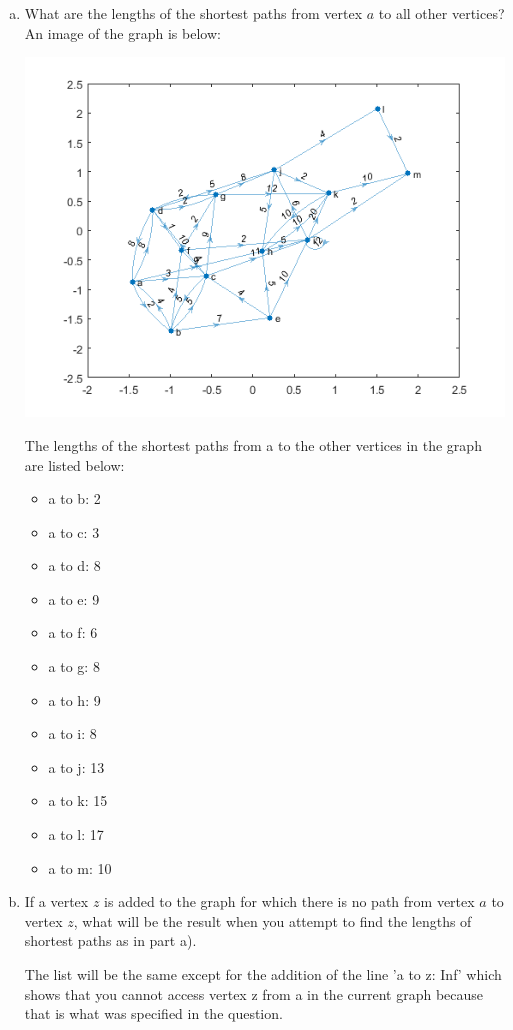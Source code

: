\documentclass[../report/main.tex]{subfiles}
\begin{document}
\begin{enumerate}[a)]
	\item What are the lengths of the shortest paths from vertex $a$ to all other vertices?
    An image of the graph is below:

    \includegraphics{../problem_three/problem3_digraph.png}

    The lengths of the shortest paths from a to the other vertices in the graph are listed below:
    \begin{itemize}
        \item a to b: 2
        \item a to c: 3
        \item a to d: 8
        \item a to e: 9
        \item a to f: 6
        \item a to g: 8
        \item a to h: 9
        \item a to i: 8
        \item a to j: 13
        \item a to k: 15
        \item a to l: 17
        \item a to m: 10
    \end{itemize}
	\item If a vertex $z$ is added to the graph for which there is no path from vertex $a$ to vertex $z$, what will be the result when you attempt to find the lengths of shortest paths as in part a).

The list will be the same except for the addition of the line 'a to z: Inf' which shows that you cannot access vertex z from a in the current graph because that is what was specified in the question.


\end{enumerate}
\end{document}
